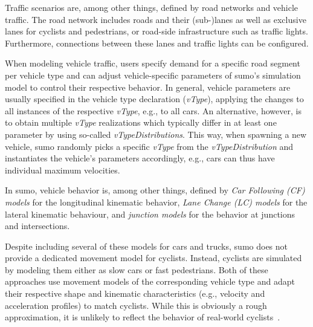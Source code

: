 Traffic scenarios are, among other things, defined by road networks and vehicle traffic.
The road network includes roads and their (sub-)lanes as well as exclusive lanes for cyclists and pedestrians, or road-side infrastructure such as traffic lights.
Furthermore, connections between these lanes and traffic lights can be configured.

When modeling vehicle traffic, users specify demand for a specific road segment per vehicle type and can adjust vehicle-specific parameters of \ac{sumo}'s simulation model to control their respective behavior.
In general, vehicle parameters are usually specified in the vehicle type declaration (\textit{vType}), applying the changes to all instances of the respective \textit{vType}, e.g., to all cars.
An alternative, however, is to obtain multiple \textit{vType} realizations which typically differ in at least one parameter by using so-called \textit{vTypeDistributions}.
This way, when spawning a new vehicle, \ac{sumo} randomly picks a specific \textit{vType} from the \textit{vTypeDistribution} and instantiates the vehicle's parameters accordingly, e.g., cars can thus have individual maximum velocities.

In \ac{sumo}, vehicle behavior is, among other things, defined by
\textit{Car Following (CF) models} for the longitudinal kinematic behavior,
\textit{Lane Change (LC) models} for the lateral kinematic behaviour,
and \textit{junction models} for the behavior at junctions and intersections.

Despite including several of these models for cars and trucks, \ac{sumo} does not provide a dedicated movement model for cyclists.
Instead, cyclists are simulated by modeling them either as slow cars or fast pedestrians.
Both of these approaches use movement models of the corresponding vehicle type and adapt their respective shape and kinematic characteristics (e.g., velocity and acceleration profiles) to match cyclists.
While this is obviously a rough approximation, it is unlikely to reflect the behavior of real-world cyclists~\cite{grigoropoulos2019modelling}.


